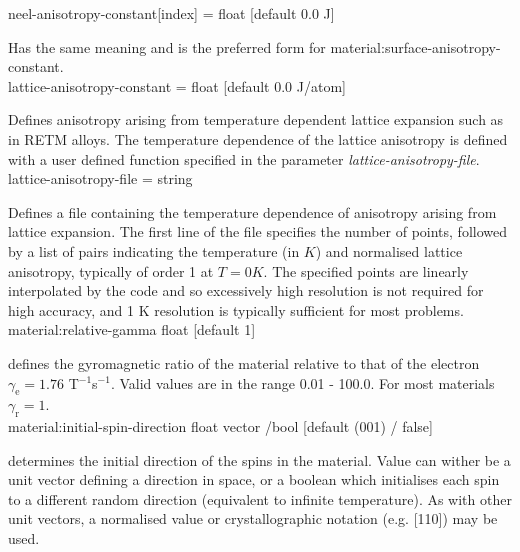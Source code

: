 {\zicf neel-anisotropy-constant[index] = float [default 0.0 J]}
Has the same meaning and is the preferred form for material:surface-anisotropy-constant.\\

{\zicf lattice-anisotropy-constant = float [default 0.0 J/atom]}
Defines anisotropy arising from temperature dependent lattice expansion
such as in RETM alloys. The temperature dependence of the lattice anisotropy is
defined with a user defined function specified in the parameter
\textit{lattice-anisotropy-file}.\\

{\zicf lattice-anisotropy-file = string}
Defines a file containing the temperature dependence of anisotropy arising from
lattice expansion. The first line of the file specifies the number of points,
followed by a list of pairs indicating the temperature (in $K$) and normalised
lattice anisotropy, typically of order 1 at $T = 0 K$. The specified points are
linearly interpolated by the code and so excessively high resolution is not
required for high accuracy, and 1 K resolution is typically sufficient for most
problems.\\


{\zicf material:relative-gamma float [default 1]} defines the gyromagnetic ratio
of the material relative to that of the electron $\gamma_{\mathrm{e}} = 1.76$ T$^{-1}$s$^{-1}$. Valid values are in the range 0.01 - 100.0. For most materials $\gamma_{\mathrm{r}} = 1$.\\

{\zicf material:initial-spin-direction float vector /bool [default (001) / false]} determines the initial direction of the spins in the material. Value can wither be a unit vector defining a direction in space, or a boolean which initialises each spin to a different random direction (equivalent to infinite temperature). As with other unit vectors, a  normalised value or crystallographic notation (e.g. [110]) may be used.\\

